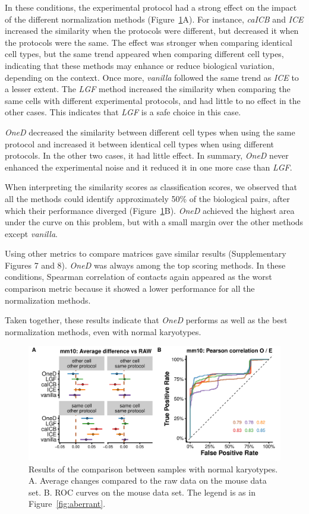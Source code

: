 \documentclass{bioinfo}
\begin{document}
In these conditions, the experimental protocol had a strong effect on the
impact of the different normalization methods (Figure~\ref{fig:normal}A).
For instance, \textit{caICB} and \textit{ICE} increased the similarity
when the protocols were different, but decreased it when the protocols
were the same. The effect was stronger when comparing identical cell
types, but the same trend appeared when comparing different cell types,
indicating that these methods may enhance or reduce biological variation,
depending on the context. Once more, \textit{vanilla} followed the same
trend as \textit{ICE} to a lesser extent. The \textit{LGF} method
increased the similarity when comparing the same cells with different
experimental protocols, and had little to no effect in the other cases.
This indicates that \textit{LGF} is a safe choice in this case.

\textit{OneD} decreased the similarity between different cell types when
using the same protocol and increased it between identical cell types when
using different protocols. In the other two cases, it had little effect.
In summary, \textit{OneD} never enhanced the experimental noise and it
reduced it in one more case than \textit{LGF}.

When interpreting the similarity scores as classification scores, we
observed that all the methods could identify approximately 50\% of the
biological pairs, after which their performance diverged
(Figure~\ref{fig:normal}B). \textit{OneD} achieved the highest area under
the curve on this problem, but with a small margin over the other methods
except \textit{vanilla}.

Using other metrics to compare matrices gave similar results
(Supplementary Figures 7 and 8). \textit{OneD} was always among the top
scoring methods. In these conditions, Spearman correlation of contacts
again appeared as the worst comparison metric because it showed a lower
performance for all the normalization methods.

Taken together, these results indicate that \textit{OneD} performs as well
as the best normalization methods, even with normal karyotypes.

\begin{figure}
\centerline{\includegraphics[width=.50\textwidth]
  {img/correlation_normal_figure4.pdf}}
\caption{
Results of the comparison between samples with normal karyotypes. A.
Average changes compared to the raw data on the mouse data set.  B. ROC
curves on the mouse data set. The legend is as in
Figure~\ref{fig:aberrant}.}
\label{fig:normal}
\end{figure}
\end{document}
